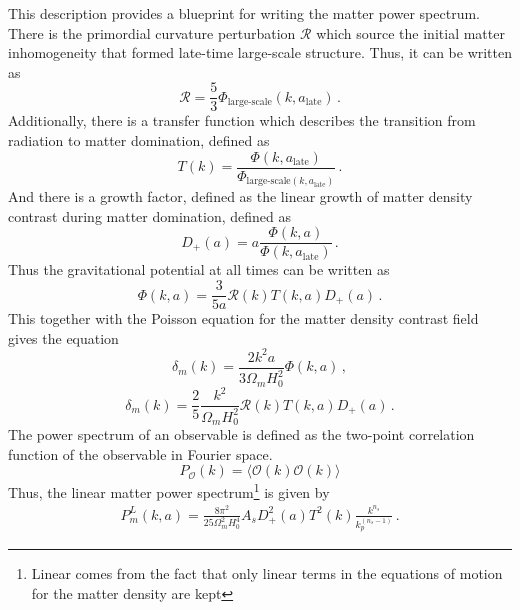 This description provides a blueprint for writing the matter power spectrum. There is the primordial curvature perturbation $\mathcal{R}$ which source the initial matter inhomogeneity that formed late-time large-scale structure. Thus, it can be written as
\begin{equation}
	\mathcal{R} = \frac{5}{3}\Phi_{\text{large-scale}}(k,a_{\text{late}})\,.
\end{equation} 
Additionally, there is a transfer function which describes the transition from radiation to matter domination, defined as
\begin{equation}
	T(k) = \frac{\Phi(k,a_{\text{late}})}{\Phi_{\text{large-scale}(k,a_{\text{late}})}}\,.
\end{equation}
And there is a growth factor, defined as the linear growth of matter density contrast during matter domination, defined as
\begin{equation}
	D_+(a) = a \frac{\Phi(k,a)}{\Phi(k,a_{\text{late}})}\,.
\end{equation}
Thus the gravitational potential at all times can be written as
\begin{equation}
	\Phi(k,a) = \frac{3}{5a}\mathcal{R}(k)T(k,a)D_+(a)\,.
\end{equation}
This together with the Poisson equation for the matter density contrast field gives the equation
\begin{equation}
	\delta_m(k) = \frac{2k^2a}{3\Omega_mH_0^2}\Phi(k,a)\,,
\end{equation}
\begin{equation}
	\delta_m(k) = \frac{2}{5}\frac{k^2}{\Omega_mH_0^2}\mathcal{R}(k)T(k,a)D_+(a)\,.
\end{equation}
The power spectrum of an observable is defined as the two-point correlation function of the observable in Fourier space.
\begin{equation}
	P_\mathcal{O}(k) = \langle \mathcal{O}(k)\mathcal{O}(k) \rangle
\end{equation}
Thus, the linear matter power spectrum\footnote{Linear comes from the fact that only linear terms in the equations of motion for the matter density are kept} is given by
\begin{equation}
	\begin{split}
		P_m^{L}(k,a) = \frac{8\pi^2}{25 \Omega_m^2 H_0^4} A_s D_+^2(a)T^2(k)\frac{k^{n_s}}{k_p^{(n_s-1)}}\,.
	\end{split}
\label{eq:power_spectrum}
\end{equation}

